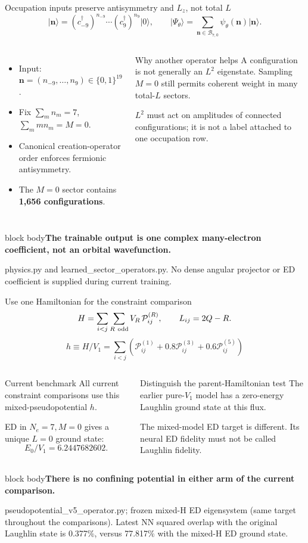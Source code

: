 \documentclass[aspectratio=169,10pt]{beamer}
\newcommand{\src}[1]{\vfill{\fontsize{6.3}{7.5}\selectfont\color{muted}#1\par}}
\newcommand{\take}[1]{\vspace{1mm}\begin{beamercolorbox}[sep=1.6mm,wd=\textwidth]{block body}\small\color{teal}\textbf{#1}\end{beamercolorbox}}
\newcommand{\ket}[1]{\lvert #1\rangle}
\newcommand{\nn}{\mathbf n}
\begin{document}
\begin{frame}{Occupation inputs preserve antisymmetry and $L_z$, not total $L$}
\[
\ket{\nn}=(c^\dagger_{-9})^{n_{-9}}\cdots(c^\dagger_9)^{n_9}\ket0,
\qquad
\ket{\Psi_\theta}=\sum_{\nn\in\mathcal B_{7,0}}\psi_\theta(\nn)\ket{\nn}.
\]
\begin{columns}[T,onlytextwidth]
\begin{itemize}\setlength\itemsep{6pt}
\item Input: $\nn=(n_{-9},\ldots,n_9)\in\{0,1\}^{19}$.
\item Fix $\sum_m n_m=7$, $\sum_m mn_m=M=0$.
\item Canonical creation-operator order enforces fermionic antisymmetry.
\item The $M=0$ sector contains \textbf{1,656 configurations}.
\end{itemize}
\begin{block}{Why another operator helps}
A configuration is not generally an $L^2$ eigenstate. Sampling $M=0$ still permits coherent weight in many total-$L$ sectors.\par\medskip
$L^2$ must act on amplitudes of connected configurations; it is not a label attached to one occupation row.
\end{block}
\end{columns}
\take{The trainable output is one complex many-electron coefficient, not an orbital wavefunction.}
\src{physics.py and learned\_sector\_operators.py. No dense angular projector or ED coefficient is supplied during current training.}
\end{frame}

\begin{frame}{Use one Hamiltonian for the constraint comparison}
\small
\[
H=\sum_{i<j}\sum_{R\ {\rm odd}}V_R\,\mathcal P^{(R)}_{ij},
\qquad L_{ij}=2Q-R.
\]
\[
\boxed{\ h\equiv H/V_1=\sum_{i<j}
\left(\mathcal P^{(1)}_{ij}+0.8\mathcal P^{(3)}_{ij}+0.6\mathcal P^{(5)}_{ij}\right)\ }
\]
\begin{columns}[T,onlytextwidth]
\begin{block}{Current benchmark}
\small
All current constraint comparisons use this mixed-pseudopotential $h$.\par\medskip
ED in $N_e=7,M=0$ gives a unique $L=0$ ground state:
\[
E_0/V_1=6.2447682602.
\]
\end{block}
\begin{block}{Distinguish the parent-Hamiltonian test}
\small
The earlier pure-$V_1$ model has a zero-energy Laughlin ground state at this flux.\par\medskip
The mixed-model ED target is different. Its neural ED fidelity must not be called Laughlin fidelity.
\end{block}
\end{columns}
\take{There is no confining potential in either arm of the current comparison.}
\src{pseudopotential\_v5\_operator.py; frozen mixed-H ED eigensystem (same target throughout the comparisons). Latest NN squared overlap with the original Laughlin state is 0.377\%, versus 77.817\% with the mixed-H ED ground state.}
\end{frame}
\end{document}
